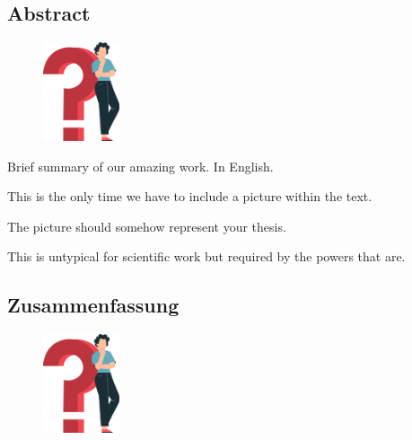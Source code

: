 \begin{spacing}{1}

    \chapter*{Abstract}

\end{spacing}

\begin{figure}

    \begin{center}

        \includegraphics[width=0.2\textwidth]{pics/question_mark}

    \end{center}

\end{figure}

Brief summary of our amazing work. In English.

This is the only time we have to include a picture within the text.

The picture should somehow represent your thesis.

This is untypical for scientific work but required by the powers that are.

\lipsum[6]

\newpage

\begin{spacing}{1}

    \chapter*{Zusammenfassung}

\end{spacing}

\begin{figure}

    \begin{center}

        \includegraphics[width=0.2\textwidth]{pics/question_mark}

    \end{center}

\end{figure}

